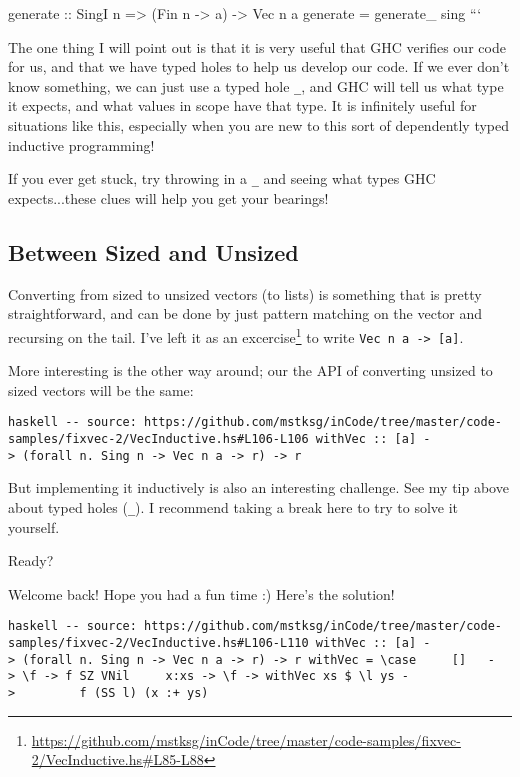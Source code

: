 \documentclass[]{article}
\renewcommand{\href}[2]{#2\footnote{\url{#1}}}
\begin{document}
generate :: SingI n =\textgreater{} (Fin n -\textgreater{} a) -\textgreater{}
Vec n a generate = generate\_ sing ```

The one thing I will point out is that it is very useful that GHC verifies our
code for us, and that we have typed holes to help us develop our code. If we
ever don't know something, we can just use a typed hole \texttt{\_}, and GHC
will tell us what type it expects, and what values in scope have that type. It
is infinitely useful for situations like this, especially when you are new to
this sort of dependently typed inductive programming!

If you ever get stuck, try throwing in a \texttt{\_} and seeing what types GHC
expects...these clues will help you get your bearings!

\subsection{Between Sized and Unsized}

Converting from sized to unsized vectors (to lists) is something that is pretty
straightforward, and can be done by just pattern matching on the vector and
recursing on the tail. I've
\href{https://github.com/mstksg/inCode/tree/master/code-samples/fixvec-2/VecInductive.hs\#L85-L88}{left
it as an excercise} to write \texttt{Vec\ n\ a\ -\textgreater{}\ {[}a{]}}.

More interesting is the other way around; our the API of converting unsized to
sized vectors will be the same:

\texttt{haskell\ -\/-\ source:\ https://github.com/mstksg/inCode/tree/master/code-samples/fixvec-2/VecInductive.hs\#L106-L106\ withVec\ ::\ {[}a{]}\ -\textgreater{}\ (forall\ n.\ Sing\ n\ -\textgreater{}\ Vec\ n\ a\ -\textgreater{}\ r)\ -\textgreater{}\ r}

But implementing it inductively is also an interesting challenge. See my tip
above about typed holes (\texttt{\_}). I recommend taking a break here to try to
solve it yourself.

Ready?

Welcome back! Hope you had a fun time :) Here's the solution!

\texttt{haskell\ -\/-\ source:\ https://github.com/mstksg/inCode/tree/master/code-samples/fixvec-2/VecInductive.hs\#L106-L110\ withVec\ ::\ {[}a{]}\ -\textgreater{}\ (forall\ n.\ Sing\ n\ -\textgreater{}\ Vec\ n\ a\ -\textgreater{}\ r)\ -\textgreater{}\ r\ withVec\ =\ \textbackslash{}case\ \ \ \ \ {[}{]}\ \ \ -\textgreater{}\ \textbackslash{}f\ -\textgreater{}\ f\ SZ\ VNil\ \ \ \ \ x:xs\ -\textgreater{}\ \textbackslash{}f\ -\textgreater{}\ withVec\ xs\ \$\ \textbackslash{}l\ ys\ -\textgreater{}\ \ \ \ \ \ \ \ \ f\ (SS\ l)\ (x\ :+\ ys)}
\end{document}
